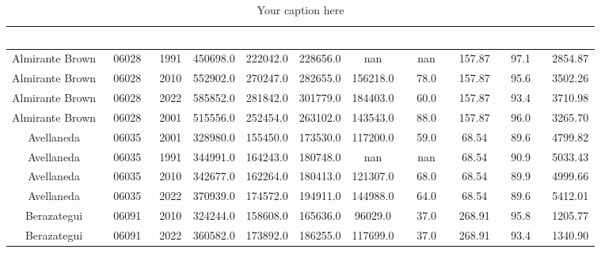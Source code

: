 \begin{table}[htb]
\centering
\begin{tabular}{|c|c|c|c|c|c|c|c|c|c|c|}
\hline
\textbf{\cellcolor[rgb]{0,0.231,0.427}\textcolor{white}{nam}} & \textbf{\cellcolor[rgb]{0,0.231,0.427}\textcolor{white}{$cod_depto$}} & \textbf{\cellcolor[rgb]{0,0.231,0.427}\textcolor{white}{anio}} & \textbf{\cellcolor[rgb]{0,0.231,0.427}\textcolor{white}{pob}} & \textbf{\cellcolor[rgb]{0,0.231,0.427}\textcolor{white}{var}} & \textbf{\cellcolor[rgb]{0,0.231,0.427}\textcolor{white}{muj}} & \textbf{\cellcolor[rgb]{0,0.231,0.427}\textcolor{white}{vivpart}} & \textbf{\cellcolor[rgb]{0,0.231,0.427}\textcolor{white}{vivtotal}} & \textbf{\cellcolor[rgb]{0,0.231,0.427}\textcolor{white}{sup}} & \textbf{\cellcolor[rgb]{0,0.231,0.427}\textcolor{white}{$ind_masc$}} & \textbf{\cellcolor[rgb]{0,0.231,0.427}\textcolor{white}{$dens_pob$}} \\ \hline
Almirante Brown & 06028 & 1991 & 450698.0 & 222042.0 & 228656.0 & nan & nan & 157.87 & 97.1 & 2854.87 \\
Almirante Brown & 06028 & 2010 & 552902.0 & 270247.0 & 282655.0 & 156218.0 & 78.0 & 157.87 & 95.6 & 3502.26 \\
Almirante Brown & 06028 & 2022 & 585852.0 & 281842.0 & 301779.0 & 184403.0 & 60.0 & 157.87 & 93.4 & 3710.98 \\
Almirante Brown & 06028 & 2001 & 515556.0 & 252454.0 & 263102.0 & 143543.0 & 88.0 & 157.87 & 96.0 & 3265.70 \\
Avellaneda & 06035 & 2001 & 328980.0 & 155450.0 & 173530.0 & 117200.0 & 59.0 & 68.54 & 89.6 & 4799.82 \\
Avellaneda & 06035 & 1991 & 344991.0 & 164243.0 & 180748.0 & nan & nan & 68.54 & 90.9 & 5033.43 \\
Avellaneda & 06035 & 2010 & 342677.0 & 162264.0 & 180413.0 & 121307.0 & 68.0 & 68.54 & 89.9 & 4999.66 \\
Avellaneda & 06035 & 2022 & 370939.0 & 174572.0 & 194911.0 & 144988.0 & 64.0 & 68.54 & 89.6 & 5412.01 \\
Berazategui & 06091 & 2010 & 324244.0 & 158608.0 & 165636.0 & 96029.0 & 37.0 & 268.91 & 95.8 & 1205.77 \\
Berazategui & 06091 & 2022 & 360582.0 & 173892.0 & 186255.0 & 117699.0 & 37.0 & 268.91 & 93.4 & 1340.90 \\
\hline
\end{tabular}
\caption{Your caption here}
\label{tab:my_table}
\end{table}

